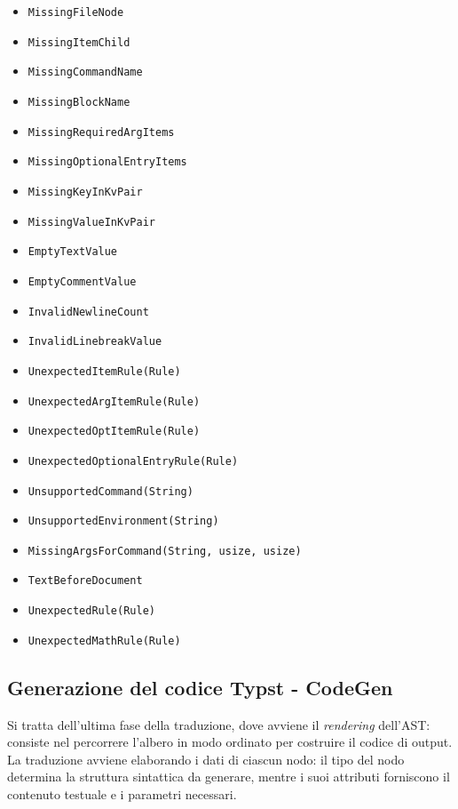 \documentclass{article}
\begin{document}
    \begin{itemize}
        \item \texttt{MissingFileNode}
        \item \texttt{MissingItemChild}
        \item \texttt{MissingCommandName}
        \item \texttt{MissingBlockName}
        \item \texttt{MissingRequiredArgItems}
        \item \texttt{MissingOptionalEntryItems}
        \item \texttt{MissingKeyInKvPair}
        \item \texttt{MissingValueInKvPair}
        \item \texttt{EmptyTextValue}
        \item \texttt{EmptyCommentValue}
        \item \texttt{InvalidNewlineCount}
        \item \texttt{InvalidLinebreakValue}
        \item \texttt{UnexpectedItemRule(Rule)}
        \item \texttt{UnexpectedArgItemRule(Rule)}
        \item \texttt{UnexpectedOptItemRule(Rule)}
        \item \texttt{UnexpectedOptionalEntryRule(Rule)}
        \item \texttt{UnsupportedCommand(String)}
        \item \texttt{UnsupportedEnvironment(String)}
        \item \texttt{MissingArgsForCommand(String, usize, usize)}
        \item \texttt{TextBeforeDocument}
        \item \texttt{UnexpectedRule(Rule)}
        \item \texttt{UnexpectedMathRule(Rule)}
    \end{itemize}

    \subsection{Generazione del codice Typst - CodeGen}

    Si tratta dell'ultima fase della traduzione, dove avviene il \textit{rendering} dell'AST: consiste nel percorrere l'albero in modo ordinato per costruire il codice di output. La traduzione avviene elaborando i dati di ciascun nodo: il tipo del nodo determina la struttura sintattica da generare, mentre i suoi attributi forniscono il contenuto testuale e i parametri necessari.
\end{document}
